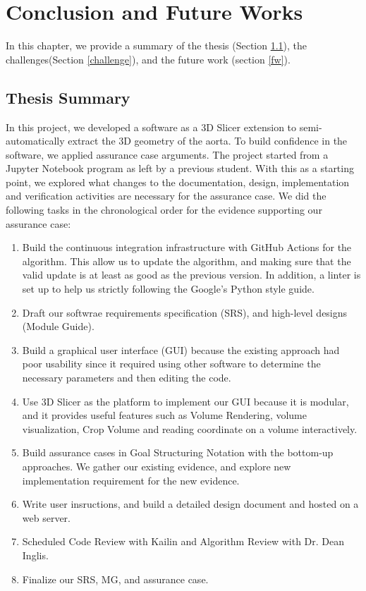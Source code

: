 \chapter{Conclusion and Future Works}

In this chapter, we provide a summary of the thesis (Section \ref{thesis_sum}), the challenges(Section \ref{challenge}), and the future work (section \ref{fw}).

\section{Thesis Summary}\label{thesis_sum}

In this project, we developed a software as a 3D Slicer extension to semi-automatically extract the 3D geometry of the aorta. To build confidence in the software, we applied assurance case arguments. The project started from a Jupyter Notebook program as left by a previous student. With this as a starting point, we explored what changes to the documentation, design, implementation and verification activities are necessary for the assurance case. We did the following tasks in the chronological order for the evidence supporting our assurance case:

\begin{enumerate}
\item Build the continuous integration infrastructure with GitHub Actions for the algorithm. This allow us to update the algorithm, and making sure that the valid update is at least as good as the previous version. In addition, a linter is set up to help us strictly following the Google's Python style guide.
\item Draft our softwrae requirements specification (SRS), and high-level designs (Module Guide).
\item Build a graphical user interface (GUI) because the existing approach had poor usability since it required using other software to determine the necessary parameters and then editing the code.
\item Use 3D Slicer as the platform to implement our GUI because it is modular, and it provides useful features such as Volume Rendering, volume visualization, Crop Volume and reading coordinate on a volume interactively.
\item Build assurance cases in Goal Structuring Notation with the bottom-up approaches. We gather our existing evidence, and explore new implementation requirement for the new evidence.
\item Write user insructions, and build a detailed design document and hosted on a web server.
\item Scheduled Code Review with Kailin and Algorithm Review with Dr. Dean Inglis.
\item Finalize our SRS, MG, and assurance case.
\end{enumerate}

